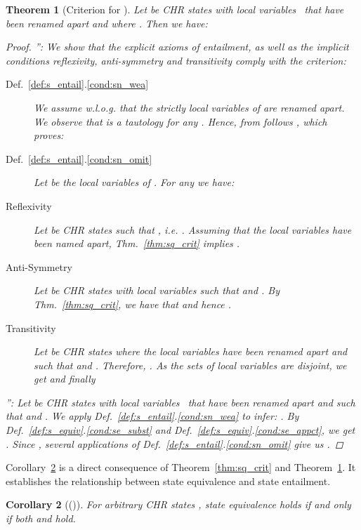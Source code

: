\documentclass[acmtocl]{acmtrans2m}
\newtheorem{theorem}{Theorem}[section]
\newtheorem{corollary}[theorem]{Corollary}
\begin{document}
\begin{theorem}[Criterion for ]\label{thm:se_crit} Let  be CHR states with local
variables~ that have been renamed apart and where .
Then we have:

\begin{proof}
\noindent'': We show that the explicit axioms of entailment, as well as the implicit conditions reflexivity,
anti-symmetry and transitivity comply with the criterion:
\begin{description}
	\item[Def.~\ref{def:s_entail}.\ref{cond:sn_wea}] We assume w.l.o.g. that the strictly local variables of  are renamed apart. We observe that
	 is
	a tautology for any . Hence, from  follows
	, which proves:
	
	\item[Def.~\ref{def:s_entail}.\ref{cond:sn_omit}] Let  be the
	local variables of . For any  we have:
	
	\item[Reflexivity] Let  be CHR
states
	such that , i.e.
	. Assuming that the local
	variables  have been named apart, Thm.~\ref{thm:sq_crit}
implies
	.
	\item[Anti-Symmetry] Let  be CHR
states
	with local variables  such that  and  . By
Thm.~\ref{thm:sq_crit},
	we have that  and hence
	.
	\item[Transitivity] Let
	 be CHR
states
	where the local variables have been renamed apart and
such
	that  and
	.
	Therefore, . As the sets of local
variables
	are disjoint, we get  and finally
	
\end{description}

\noindent'': Let  be
CHR states with local variables~ that have been renamed apart and such
that  and
.
We apply Def.~\ref{def:s_entail}.\ref{cond:sn_wea} to infer:
.
By Def.~\ref{def:s_equiv}.\ref{cond:se_subst} and
Def.~\ref{def:s_equiv}.\ref{cond:se_appct}, we get
.
Since , several applications of
Def.~\ref{def:s_entail}.\ref{cond:sn_omit} give us
.
\end{proof}
\end{theorem}

Corollary~\ref{crl:ent-equiv} is a direct consequence of Theorem~\ref{thm:sq_crit}
and Theorem~\ref{thm:se_crit}. It establishes the relationship between state
equivalence and state entailment.

\begin{corollary}[()]
\label{crl:ent-equiv}
  For arbitrary CHR states , state equivalence  holds \emph{if
  and only if} both  and  hold.
\end{corollary}
\end{document}
